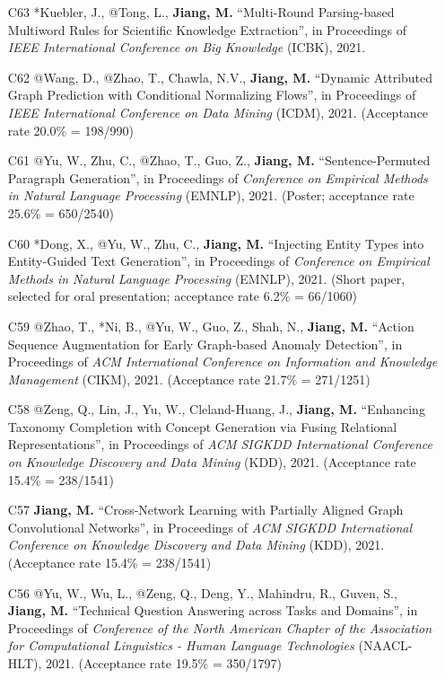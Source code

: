 \documentclass[10pt]{article}
\newenvironment{myindentpar}[1]%
{\begin{list}{}%
         {\setlength{\leftmargin}{#1}}%
         \item[]%
}
{\end{list}}
\newcounter{list}
\begin{document}
\begin{myindentpar}{0.00cm}
\begin{enumerate}[leftmargin=.5cm]
\item[C63] *Kuebler, J., @Tong, L., \textbf{Jiang, M.} ``Multi-Round Parsing-based Multiword Rules for Scientific Knowledge Extraction'', in Proceedings of \textit{IEEE International Conference on Big Knowledge} (ICBK), 2021.
		
\item[C62] @Wang, D., @Zhao, T., Chawla, N.V., \textbf{Jiang, M.} ``Dynamic Attributed Graph Prediction with Conditional Normalizing Flows'', in Proceedings of \textit{IEEE International Conference on Data Mining} (ICDM), 2021. (Acceptance rate 20.0\% = 198/990)

\item[C61] @Yu, W., Zhu, C., @Zhao, T., Guo, Z., \textbf{Jiang, M.} ``Sentence-Permuted Paragraph Generation'', in Proceedings of \textit{Conference on Empirical Methods in Natural Language Processing} (EMNLP), 2021. (Poster; acceptance rate 25.6\% = 650/2540)

\item[C60] *Dong, X., @Yu, W., Zhu, C., \textbf{Jiang, M.} ``Injecting Entity Types into Entity-Guided Text Generation'', in Proceedings of \textit{Conference on Empirical Methods in Natural Language Processing} (EMNLP), 2021. (Short paper, selected for oral presentation; acceptance rate 6.2\% = 66/1060)

\item[C59] @Zhao, T., *Ni, B., @Yu, W., Guo, Z., Shah, N., \textbf{Jiang, M.} ``Action Sequence Augmentation for Early Graph-based Anomaly Detection'', in Proceedings of \textit{ACM International Conference on Information and Knowledge Management} (CIKM), 2021. (Acceptance rate 21.7\% = 271/1251)
		
\item[C58] @Zeng, Q., Lin, J., Yu, W., Cleland-Huang, J., \textbf{Jiang, M.} ``Enhancing Taxonomy Completion with Concept Generation via Fusing Relational Representations'', in Proceedings of \textit{ACM SIGKDD International Conference on Knowledge Discovery and Data Mining} (KDD), 2021. (Acceptance rate 15.4\% = 238/1541)

\item[C57] \textbf{Jiang, M.} ``Cross-Network Learning with Partially Aligned Graph Convolutional Networks'', in Proceedings of \textit{ACM SIGKDD International Conference on Knowledge Discovery and Data Mining} (KDD), 2021. (Acceptance rate 15.4\% = 238/1541)	

\item[C56] @Yu, W., Wu, L., @Zeng, Q., Deng, Y., Mahindru, R., Guven, S., \textbf{Jiang, M.} ``Technical Question Answering across Tasks and Domains'', in Proceedings of \textit{Conference of the North American Chapter of the Association for Computational Linguistics - Human Language Technologies} (NAACL-HLT), 2021. (Acceptance rate 19.5\% = 350/1797)


\end{enumerate}
\end{myindentpar}
\end{document}
